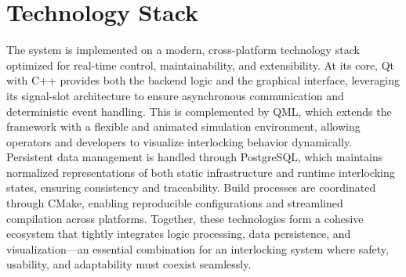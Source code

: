 \section{Technology Stack}
\label{sec:implementation:tech-stack}

The system is implemented on a modern, cross-platform technology stack optimized for real-time control, maintainability, and extensibility. At its core, Qt with C++ provides both the backend logic and the graphical interface, leveraging its signal-slot architecture to ensure asynchronous communication and deterministic event handling. This is complemented by QML, which extends the framework with a flexible and animated simulation environment, allowing operators and developers to visualize interlocking behavior dynamically. Persistent data management is handled through PostgreSQL, which maintains normalized representations of both static infrastructure and runtime interlocking states, ensuring consistency and traceability. Build processes are coordinated through CMake, enabling reproducible configurations and streamlined compilation across platforms. Together, these technologies form a cohesive ecosystem that tightly integrates logic processing, data persistence, and visualization—an essential combination for an interlocking system where safety, usability, and adaptability must coexist seamlessly.
